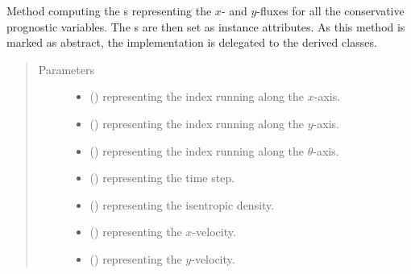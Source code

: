 \documentclass[letterpaper,10pt,english]{sphinxmanual}
\begin{document}
\begin{fulllineitems}
\begin{fulllineitems}
\label{\detokenize{api:tasmania.dycore.flux_isentropic.FluxIsentropic._compute_horizontal_fluxes}}
Method computing the s representing the \(x\)- and
\(y\)-fluxes for all the conservative prognostic variables.
The s are then set as instance attributes.
As this method is marked as abstract, the implementation is delegated to the derived classes.
\begin{quote}\begin{description}
\item[{Parameters}] \leavevmode\begin{itemize}
\item {} 
 () \textendash{}  representing the index running along the \(x\)-axis.

\item {} 
 () \textendash{}  representing the index running along the \(y\)-axis.

\item {} 
 () \textendash{}  representing the index running along the \(\theta\)-axis.

\item {} 
 () \textendash{}  representing the time step.

\item {} 
 () \textendash{}  representing the isentropic density.

\item {} 
 () \textendash{}  representing the \(x\)-velocity.

\item {} 
 () \textendash{}  representing the \(y\)-velocity.


\end{itemize}
\end{description}
\end{quote}
\end{fulllineitems}
\end{fulllineitems}
\end{document}
